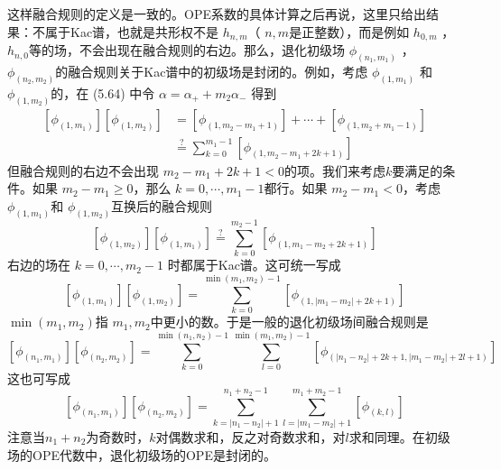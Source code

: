 这样融合规则的定义是一致的。OPE系数的具体计算之后再说，这里只给出结果：不属于Kac谱，也就是共形权不是 $h_{n,m} $（ $n,m $是正整数），而是例如 $h_{0,m}$ ， $h_{n,0} $等的场，不会出现在融合规则的右边。那么，退化初级场 $\phi_{\left(n_{1}, m_{1}\right)}$ ， $\phi_{\left(n_{2}, m_{2}\right)} $的融合规则关于Kac谱中的初级场是封闭的。例如，考虑 $\phi_{\left(1, m_{1}\right)}$ 和 $\phi_{\left(1, m_{2}\right)} $的，在 (5.64) 中令 $\alpha=\alpha_{+}+m_{2} \alpha_{-}$ 得到
\begin{equation}
	\begin{aligned} \left[\phi_{\left(1, m_{1}\right)}\right]\left[\phi_{\left(1, m_{2}\right)}\right] &=\left[\phi_{\left(1, m_{2}-m_{1}+1\right)}\right]+\cdots+\left[\phi_{\left(1, m_{2}+m_{1}-1\right)}\right] \\ & \stackrel{?}{=} \sum_{k=0}^{m_{1}-1}\left[\phi_{\left(1, m_{2}-m_{1}+2 k+1\right)}\right] \end{aligned}
\end{equation}
但融合规则的右边不会出现 $m_{2}-m_{1}+2 k+1<0 $的项。我们来考虑$ k $要满足的条件。如果 $m_{2}-m_{1} \geq 0 $，那么 $k=0, \cdots, m_{1}-1 $都行。如果 $m_{2}-m_{1}<0 $，考虑 $\phi_{\left(1, m_{1}\right)} $和 $\phi_{\left(1, m_{2}\right)} $互换后的融合规则
\begin{equation}
	\left[\phi_{\left(1, m_{2}\right)}\right]\left[\phi_{\left(1, m_{1}\right)}\right] \stackrel{?}{=} \sum_{k=0}^{m_{2}-1}\left[\phi_{\left(1, m_{1}-m_{2}+2 k+1\right)}\right]
\end{equation}
右边的场在 $k=0, \cdots, m_{2}-1$ 时都属于Kac谱。这可统一写成
\begin{equation}
	\left[\phi_{\left(1, m_{1}\right)}\right]\left[\phi_{\left(1, m_{2}\right)}\right]=\sum_{k=0}^{\min \left(m_{1}, m_{2}\right)-1}\left[\phi_{\left(1,\left|m_{1}-m_{2}\right|+2 k+1\right)}\right]
\end{equation}
$\min \left(m_{1}, m_{2}\right) $指 $m_1,m_2 $中更小的数。于是一般的退化初级场间融合规则是
\begin{equation}
	\left[\phi_{\left(n_{1}, m_{1}\right)}\right]\left[\phi_{\left(n_{2}, m_{2}\right)}\right]=\sum_{k=0}^{\min \left(n_{1}, n_{2}\right)-1 } \sum_{l=0}^{\min \left(m_{1}, m_{2}\right)-1}\left[\phi_{\left(\left|n_{1}-n_{2}\right|+2 k+1,\left|m_{1}-m_{2}\right|+2 l+1\right)}\right]
\end{equation}
这也可写成
\begin{equation}
	\left[\phi_{\left(n_{1}, m_{1}\right)}\right]\left[\phi_{\left(n_{2}, m_{2}\right)}\right]=\sum_{k=\left|n_{1}-n_{2}\right|+1}^{n_{1}+n_{2}-1} \sum_{l=\left|m_{1}-m_{2}\right|+1}^{m_{1}+m_{2}-1}\left[\phi_{(k, l)}\right]
\end{equation}
注意当$n_1+n_2$为奇数时，$k$对偶数求和，反之对奇数求和，对$l$求和同理。在初级场的OPE代数中，退化初级场的OPE是封闭的。

